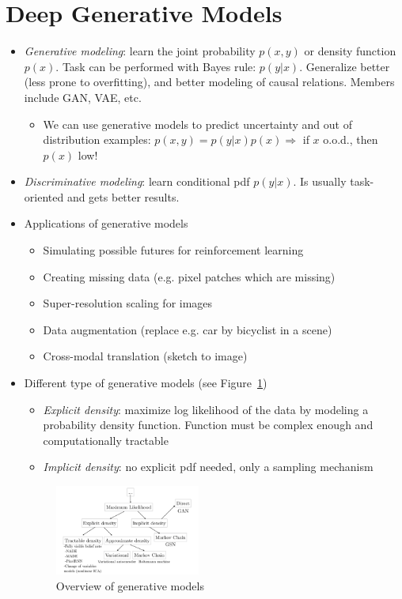 \section{Deep Generative Models}
\begin{itemize}
	\item \textit{Generative modeling}: learn the joint probability $p(x,y)$ or density function $p(x)$. Task can be performed with Bayes rule: $p(y|x)$. Generalize better (less prone to overfitting), and better modeling of causal relations. Members include GAN, VAE, etc.
	\begin{itemize}
		\item We can use generative models to predict uncertainty and out of distribution examples: $p(x,y) = p(y|x)p(x) \Rightarrow$ if $x$ o.o.d., then $p(x)$ low!
	\end{itemize}
	\item \textit{Discriminative modeling}: learn conditional pdf $p(y|x)$. Is usually task-oriented and gets better results. 
	\item Applications of generative models
	\begin{itemize}
		\item Simulating possible futures for reinforcement learning
		\item Creating missing data  (e.g. pixel patches which are missing)
		\item Super-resolution scaling for images
		\item Data augmentation (replace e.g. car by bicyclist in a scene)
		\item Cross-modal translation (sketch to image)
	\end{itemize}
	\item Different type of generative models (see Figure~\ref{fig:GAN_generative_models_overview})
	\begin{itemize}
		\item \textit{Explicit density}: maximize log likelihood of the data by modeling a probability density function. Function must be complex enough and computationally tractable
		\item \textit{Implicit density}: no explicit pdf needed, only a sampling mechanism
	\end{itemize}
	\begin{figure}[ht!]
		\centering
		\includegraphics[width=0.45\textwidth]{figures/GAN_generative_models_overview_2.png}
		\caption{Overview of generative models}
		\label{fig:GAN_generative_models_overview}
	\end{figure}
\end{itemize}
